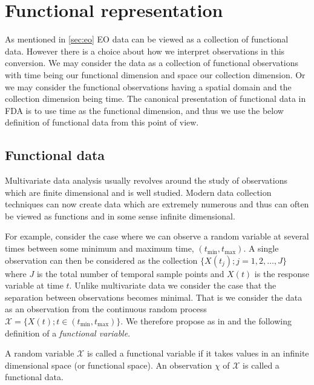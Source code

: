 \section{Functional representation \label{sec:fr}}
As mentioned in \ref{sec:eo} EO data can be viewed as a collection of functional data. However there is a choice about how we interpret observations in this conversion. We may consider the data as a collection of functional observations with time being our functional dimension and space our collection dimension. Or we may consider the functional observations having a spatial domain and the collection dimension being time. The canonical presentation of functional data in FDA is to use time as the functional dimension, \citep{ramsay_functional_2010} and thus we use the below definition of functional data from this point of view. 

\subsection{Functional data \label{ssec:fd}}
Multivariate data analysis usually revolves around the study of observations which are finite dimensional  and is well studied. Modern data collection techniques can now create data which are extremely numerous and thus can often be viewed as functions and in some sense infinite dimensional. 

For example, \citeauthor{ferraty_nonparametric_2006} consider the case where we can observe a random variable at several times between some minimum and maximum time, $\left( t_{\text{min}}, t_{\text{max}} \right)$. A single observation can then be considered as the collection $ \{ X(t_j) ; j=1,2,\dots, J\}$ where $J$ is the total number of temporal sample points and $X(t)$ is the response variable at time $t$. Unlike multivariate data we consider the case that the separation between observations becomes minimal. That is we consider the data as an observation from the continuous random process $\mathcal{X} = \{X(t); t \in \left( t_\text{min}, t_\text{max} \right)\}$. We therefore propose as in \citep{ferraty_nonparametric_2006} and \citep{shi_gaussian_2011} the following definition of a \textit{functional variable}.

 \begin{definition}
	A random variable $\mathcal{X}$ is called a functional variable if it takes values in an infinite dimensional space (or functional space). An observation $\chi$ of $\mathcal{X}$ is called a functional data.
	\label{def:functional_variable}
\end{definition}

